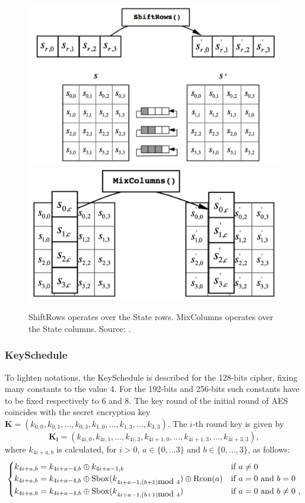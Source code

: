 \begin{figure}
\centering
\includegraphics[width = .45\textwidth]{../Figures/FISP_AES/shift_rows.pdf} 
\includegraphics[width = .45\textwidth]{../Figures/FISP_AES/mix_columns.pdf} 
\caption[ShiftRows and MixColumns.]{ShiftRows operates over the State rows. MixColumns operates over the State columns. Source: \cite{nist197}.}\label{fig:AES_sr_mc}
\end{figure}


\subsubsection*{KeySchedule}
To lighten notations, the KeySchedule is described for the 128-bits cipher, fixing many constants to the value 4. For the 192-bits and 256-bits such constants have to be fixed respectively to 6 and 8. The key round of the initial round of AES coincides with the secret encryption key $\boldsymbol{K} = (k_{0,0},k_{0,1},\dots,k_{0,3}, k_{1,0},\dots,k_{1,3},\dots,k_{3,3})$. The $i$-th round key is given by 
\begin{equation*}
\boldsymbol{K_i} = (k_{4i,0},k_{4i,1},\dots,k_{4i,3}, k_{4i+1,0},\dots,k_{4i+1,3},\dots,k_{4i+3,3}),
\end{equation*}
where $k_{4i+a,b}$ is calculated, for $i>0$,  $a\in\{0,\dots 3\} $ and $ b\in\{0,\dots,3\}$, as follows: 
\begin{equation*}
\begin{cases}
k_{4i + a,b} = k_{4i +a-4,b}\oplus k_{4i +a-1,b} & \mbox{if } a \neq 0 \\
k_{4i + a,b} = k_{4i +a-4,b}\oplus \mathrm{Sbox}(k_{4i +a-1,(b+1) \mbox{mod } 4}) \oplus \mathrm{Rcon}(a) & \mbox{if } a = 0 \mbox{ and } b=0\\
k_{4i + a,b} = k_{4i+a-4,b}\oplus \mathrm{Sbox}(k_{4i+a-1,(b+1) \mbox{mod } 4})  & \mbox{if } a =0 \mbox{ and } b\neq 0 \mbox{ ,} 
\end{cases}
\end{equation*}


